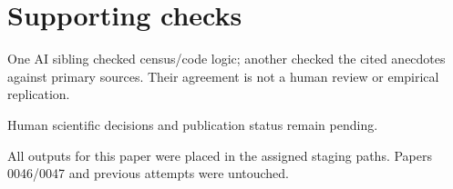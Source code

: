 \documentclass[10pt]{article}
\begin{document}
\section*{Supporting checks}
One AI sibling checked census/code logic; another checked the cited anecdotes against primary sources. Their agreement is not a human review or empirical replication.\par
Human scientific decisions and publication status remain pending.\par
All outputs for this paper were placed in the assigned staging paths. Papers 0046/0047 and previous attempts were untouched.\par
\end{document}
